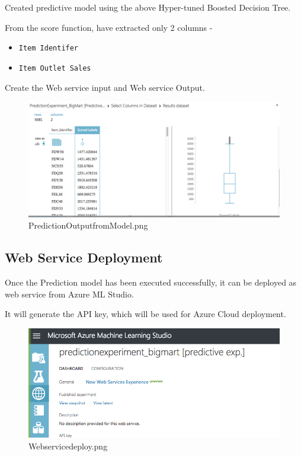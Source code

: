 Created predictive model using the above Hyper-tuned Boosted Decision Tree.

From the score function, have extracted only 2 columns -
\begin{itemize}
\item \verb|Item Identifer|
\item \verb|Item Outlet Sales|
\end{itemize}

Create the Web service input and Web service Output.

\begin{figure}[pic5]
	\centering\includegraphics[width=\columnwidth]{Images/mlstudio/PredictionOutputfromModel.png}
	\caption{PredictionOutputfromModel.png}\label{fig:PredictionOutputfromModel}
\end{figure}

\subsection{Web Service Deployment}
Once the Prediction model has been executed successfully, it can be deployed as web service 
from Azure ML Studio.

It will generate the API key, which will be used for Azure Cloud deployment.

\begin{figure}[pic6]
	\centering\includegraphics[width=\columnwidth]{Images/mlstudio/Webservicedeploy.png}
	\caption{Webservicedeploy.png}\label{fig:Webservicedeploy}
\end{figure}

